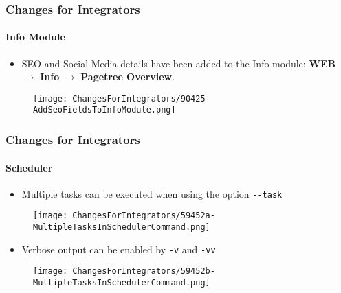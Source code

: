 
\begin{frame}[fragile]
	\frametitle{Changes for Integrators}
	\framesubtitle{Info Module}

	\begin{itemize}
		\item SEO and Social Media details have been added to the Info module:\newline
			\textbf{WEB} $\rightarrow$ \textbf{Info} $\rightarrow$ \textbf{Pagetree Overview}.
	\end{itemize}

	\begin{figure}
		\texttt{[image: ChangesForIntegrators/90425-AddSeoFieldsToInfoModule.png]}
	\end{figure}

\end{frame}


\begin{frame}[fragile]
	\frametitle{Changes for Integrators}
	\framesubtitle{Scheduler}

	\lstset{basicstyle=\tiny\ttfamily}

	\begin{itemize}
		\item Multiple tasks can be executed when using the option \texttt{-}\texttt{-}\texttt{task}
	\end{itemize}

	\begin{figure}
		\texttt{[image: ChangesForIntegrators/59452a-MultipleTasksInSchedulerCommand.png]}
	\end{figure}

	\begin{itemize}
		\item Verbose output can be enabled by \texttt{-}\texttt{v} and \texttt{-}\texttt{vv}
	\end{itemize}

	\begin{figure}
		\texttt{[image: ChangesForIntegrators/59452b-MultipleTasksInSchedulerCommand.png]}
	\end{figure}

\end{frame}

